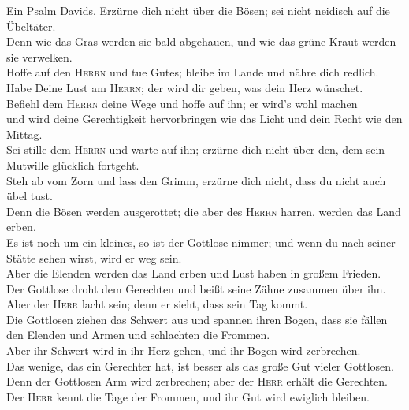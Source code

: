 Ein Psalm Davids. Erzürne dich nicht über die Bösen; sei
nicht neidisch auf die Übeltäter.\\
 Denn wie das Gras werden sie bald abgehauen, und wie das
grüne Kraut werden sie verwelken.\\
 Hoffe auf den \textsc{Herrn} und tue Gutes; bleibe im
Lande und nähre dich redlich.\\
 Habe Deine Lust am \textsc{Herrn}; der wird dir geben,
was dein Herz wünschet.\\
 Befiehl dem \textsc{Herrn} deine Wege und hoffe auf ihn;
er wird's wohl machen\\
 und wird deine Gerechtigkeit hervorbringen wie das Licht
und dein Recht wie den Mittag.\\
 Sei stille dem \textsc{Herrn} und warte auf ihn; erzürne
dich nicht über den, dem sein Mutwille glücklich fortgeht.\\
 Steh ab vom Zorn und lass den Grimm, erzürne dich nicht,
dass du nicht auch übel tust.\\
 Denn die Bösen werden ausgerottet; die aber des
\textsc{Herrn} harren, werden das Land erben.\\
 Es ist noch um ein kleines, so ist der Gottlose nimmer;
und wenn du nach seiner Stätte sehen wirst, wird er weg sein.\\
 Aber die Elenden werden das Land erben und Lust haben in
großem Frieden.\\
 Der Gottlose droht dem Gerechten und beißt seine Zähne
zusammen über ihn.\\
 Aber der \textsc{Herr} lacht sein; denn er sieht, dass
sein Tag kommt.\\
 Die Gottlosen ziehen das Schwert aus und spannen ihren
Bogen, dass sie fällen den Elenden und Armen und schlachten die
Frommen.\\
 Aber ihr Schwert wird in ihr Herz gehen, und ihr Bogen
wird zerbrechen.\\
 Das wenige, das ein Gerechter hat, ist besser als das
große Gut vieler Gottlosen.\\
 Denn der Gottlosen Arm wird zerbrechen; aber der
\textsc{Herr} erhält die Gerechten.\\
 Der \textsc{Herr} kennt die Tage der Frommen, und ihr
Gut wird ewiglich bleiben.\\
